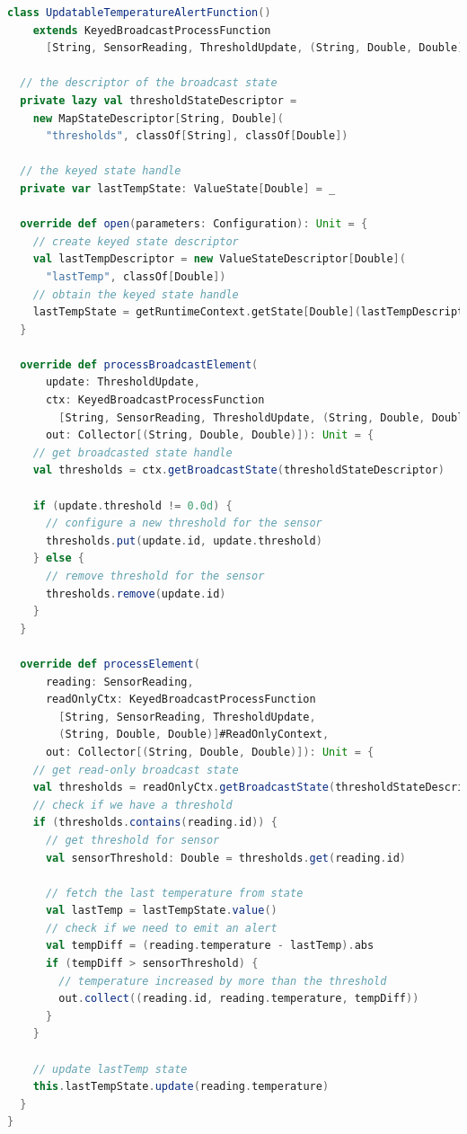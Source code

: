 \documentclass[oneside]{ctexbook}
\begin{document}
\begin{lstlisting}[language=scala]
class UpdatableTemperatureAlertFunction()
    extends KeyedBroadcastProcessFunction
      [String, SensorReading, ThresholdUpdate, (String, Double, Double)] {

  // the descriptor of the broadcast state
  private lazy val thresholdStateDescriptor =
    new MapStateDescriptor[String, Double](
      "thresholds", classOf[String], classOf[Double])

  // the keyed state handle
  private var lastTempState: ValueState[Double] = _

  override def open(parameters: Configuration): Unit = {
    // create keyed state descriptor
    val lastTempDescriptor = new ValueStateDescriptor[Double](
      "lastTemp", classOf[Double])
    // obtain the keyed state handle
    lastTempState = getRuntimeContext.getState[Double](lastTempDescriptor)
  }

  override def processBroadcastElement(
      update: ThresholdUpdate,
      ctx: KeyedBroadcastProcessFunction
        [String, SensorReading, ThresholdUpdate, (String, Double, Double)]#Context,
      out: Collector[(String, Double, Double)]): Unit = {
    // get broadcasted state handle
    val thresholds = ctx.getBroadcastState(thresholdStateDescriptor)

    if (update.threshold != 0.0d) {
      // configure a new threshold for the sensor
      thresholds.put(update.id, update.threshold)
    } else {
      // remove threshold for the sensor
      thresholds.remove(update.id)
    }
  }

  override def processElement(
      reading: SensorReading,
      readOnlyCtx: KeyedBroadcastProcessFunction
        [String, SensorReading, ThresholdUpdate, 
        (String, Double, Double)]#ReadOnlyContext,
      out: Collector[(String, Double, Double)]): Unit = {
    // get read-only broadcast state
    val thresholds = readOnlyCtx.getBroadcastState(thresholdStateDescriptor)
    // check if we have a threshold
    if (thresholds.contains(reading.id)) {
      // get threshold for sensor
      val sensorThreshold: Double = thresholds.get(reading.id)

      // fetch the last temperature from state
      val lastTemp = lastTempState.value()
      // check if we need to emit an alert
      val tempDiff = (reading.temperature - lastTemp).abs
      if (tempDiff > sensorThreshold) {
        // temperature increased by more than the threshold
        out.collect((reading.id, reading.temperature, tempDiff))
      }
    }

    // update lastTemp state
    this.lastTempState.update(reading.temperature)
  }
}
\end{lstlisting}
\end{document}
